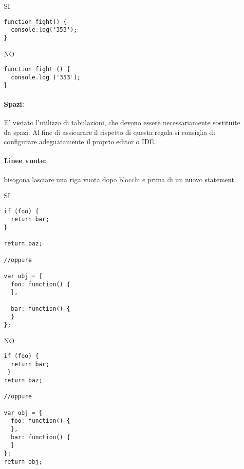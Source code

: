 \documentclass[../processi_primari.tex]{subfiles}
\begin{document}
\begin{minipage}{6cm}
{\begin{center}SI\end{center}}
\begin{Verbatim}[frame=single]
function fight() {
  console.log('353');
}
\end{Verbatim}
\end{minipage}
\hfill
\begin{minipage}{6cm}
{\begin{center}NO\end{center}}
\begin{Verbatim}[frame=single]
function fight () {
  console.log ('353');
}
\end{Verbatim}
\end{minipage}


\paragraph*{Spazi: }
E' vietato l'utilizzo di tabulazioni, che devono essere necessariamente sostituite da spazi. Al fine di assicurare il rispetto di questa regola si consiglia di configurare adeguatamente il proprio editor o IDE.
\paragraph*{Linee vuote: }
bisogona lasciare una riga vuota dopo blocchi e prima di un nuovo statement.

\begin{minipage}{6cm}
	{\begin{center}SI\end{center}}
	\begin{Verbatim}[frame=single]
if (foo) {
  return bar;
}

return baz;
	
//oppure 
	
var obj = {
  foo: function() {
  },
	
  bar: function() {
  }
};
\end{Verbatim}
\end{minipage}
\hfill
\begin{minipage}{6cm}
	{\begin{center}NO\end{center}}
	\begin{Verbatim}[frame=single]
if (foo) {
  return bar;
 }
return baz;
	
//oppure
	
var obj = {
  foo: function() {
  },
  bar: function() {
  }
};
return obj;
	
	\end{Verbatim}
\end{minipage}
\end{document}
